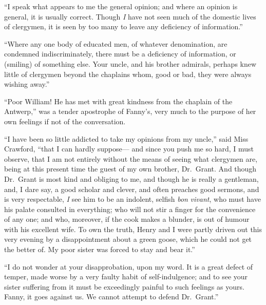 \documentclass{article}
\begin{document}
``I speak what appears to me the general opinion;
and where an opinion is general, it is usually correct.
Though \emph{I} have not seen much of the domestic lives
of clergymen, it is seen by too many to leave any deficiency
of information.''

``Where any one body of educated men, of whatever denomination,
are condemned indiscriminately, there must be a deficiency
of information, or (smiling) of something else.
Your uncle, and his brother admirals, perhaps knew little
of clergymen beyond the chaplains whom, good or bad,
they were always wishing away.''

``Poor William!  He has met with great kindness from
the chaplain of the Antwerp,'' was a tender apostrophe
of Fanny's, very much to the purpose of her own feelings
if not of the conversation.

``I have been so little addicted to take my opinions from
my uncle,'' said Miss Crawford, ``that I can hardly suppose---%
and since you push me so hard, I must observe, that I am
not entirely without the means of seeing what clergymen are,
being at this present time the guest of my own brother,
Dr.\ Grant.  And though Dr.\ Grant is most kind and obliging
to me, and though he is really a gentleman, and, I dare say,
a good scholar and clever, and often preaches good sermons,
and is very respectable, \emph{I} see him to be an indolent,
selfish \emph{bon} \emph{vivant}, who must have his palate consulted
in everything; who will not stir a finger for the convenience
of any one; and who, moreover, if the cook makes a blunder,
is out of humour with his excellent wife.  To own the truth,
Henry and I were partly driven out this very evening
by a disappointment about a green goose, which he could
not get the better of.  My poor sister was forced to stay
and bear it.''

``I do not wonder at your disapprobation, upon my word.
It is a great defect of temper, made worse by a very faulty
habit of self-indulgence; and to see your sister suffering
from it must be exceedingly painful to such feelings
as yours.  Fanny, it goes against us.  We cannot attempt
to defend Dr.\ Grant.''
\end{document}

